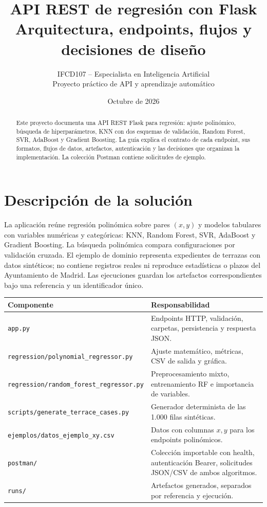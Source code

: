 \documentclass[11pt,a4paper]{article}
\title{API REST de regresión con Flask\\\large Arquitectura, endpoints, flujos y decisiones de diseño}
\author{IFCD107 -- Especialista en Inteligencia Artificial\\Proyecto práctico de API y aprendizaje automático}
\date{Octubre de 2026}
\begin{document}
\maketitle
\thispagestyle{fancy}
\begin{abstract}
Este proyecto documenta una API REST Flask para regresión: ajuste polinómico, búsqueda de hiperparámetros, KNN con dos esquemas de validación, Random Forest, SVR, AdaBoost y Gradient Boosting. La guía explica el contrato de cada endpoint, sus formatos, flujos de datos, artefactos, autenticación y las decisiones que organizan la implementación. La colección Postman contiene solicitudes de ejemplo.
\end{abstract}

\section{Descripción de la solución}
La aplicación reúne regresión polinómica sobre pares $(x,y)$ y modelos tabulares con variables numéricas y categóricas: KNN, Random Forest, SVR, AdaBoost y Gradient Boosting. La búsqueda polinómica compara configuraciones por validación cruzada. El ejemplo de dominio representa expedientes de terrazas con datos sintéticos; no contiene registros reales ni reproduce estadísticas o plazos del Ayuntamiento de Madrid. Las ejecuciones guardan los artefactos correspondientes bajo una referencia y un identificador único.

\begin{center}
\begin{tabular}{ll}\toprule
Componente & Responsabilidad\\\midrule
\texttt{app.py} & Endpoints HTTP, validación, carpetas, persistencia y respuesta JSON.\\
\texttt{regression/polynomial\_regressor.py} & Ajuste matemático, métricas, CSV de salida y gráfica.\\
\texttt{regression/random\_forest\_regressor.py} & Preprocesamiento mixto, entrenamiento RF e importancia de variables.\\
\texttt{scripts/generate\_terrace\_cases.py} & Generador determinista de las 1.000 filas sintéticas.\\
\texttt{ejemplos/datos\_ejemplo\_xy.csv} & Datos con columnas $x,y$ para los endpoints polinómicos.\\
\texttt{postman/} & Colección importable con health, autenticación Bearer, solicitudes JSON/CSV de ambos algoritmos.\\
\texttt{runs/} & Artefactos generados, separados por referencia y ejecución.\\\bottomrule
\end{tabular}
\end{center}
\end{document}
